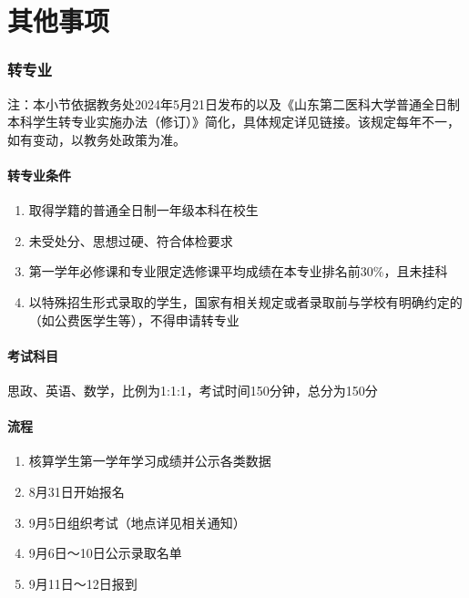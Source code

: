 \part[其他事项]{其他事项}

\section[转专业]{转专业}
注：本小节依据教务处2024年5月21日发布的以及《山东第二医科大学普通全日制本科学生转专业实施办法（修订）》简化，具体规定详见链接。该规定每年不一，如有变动，以教务处政策为准。

\subsection[转专业条件]{转专业条件}
\begin{enumerate}
    \item 取得学籍的普通全日制一年级本科在校生
    \item 未受处分、思想过硬、符合体检要求
    \item 第一学年必修课和专业限定选修课平均成绩在本专业排名前30\%，且未挂科
    \item 以特殊招生形式录取的学生，国家有相关规定或者录取前与学校有明确约定的（如公费医学生等），不得申请转专业
\end{enumerate}

\subsection[考试科目]{考试科目}
思政、英语\footnotemark、数学，比例为1:1:1，考试时间150分钟，总分为150分

\subsection[流程]{流程}
\begin{enumerate}
    \item 核算学生第一学年学习成绩并公示各类数据
    \item 8月31日开始报名
    \item 9月5日组织考试（地点详见相关通知）
    \item 9月6日～10日公示录取名单\footnotemark
    \item 9月11日～12日报到
\end{enumerate}

